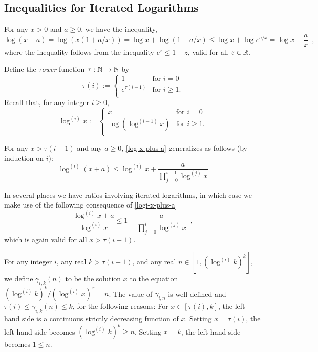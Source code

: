 \documentclass[kpfonts]{patmorin}
\theoremstyle{named}
\begin{document}
\subsection{Inequalities for Iterated Logarithms}

For any $x> 0$ and $a\ge 0$, we have the inequality,
\begin{equation}
    \log (x+a) = \log (x(1+a/x)) = \log x + \log(1+a/x) \le \log x + \log e^{a/x} = \log x + \frac{a}{x} \enspace , \label{log-x-plus-a}
\end{equation}
where the inequality follows from the inequality $e^z \le 1+z$, valid for all $z\in\mathbb{R}$.

Define the \emph{$\tau$ower} function $\tau:\mathbb{N}\to\mathbb{N}$ by
\[
  \tau(i) :=
    \begin{cases}
        1 & \text{for $i=0$} \\
        e^{\tau(i-1)} & \text{for $i\ge 1$.} \\
    \end{cases}
\]
Recall that, for any integer $i\ge 0$,
\[
    \log^{(i)} x :=
      \begin{cases}
          x & \text{for $i=0$} \\
          \log\left(\log^{(i-1)}x\right) & \text{for $i\ge 1$.} \\
      \end{cases}
\]

For any $x > \tau(i-1)$ and any $a\ge 0$, \cref{log-x-plus-a} generalizes as follows (by induction on $i$):
\begin{equation}
    \log^{(i)}(x+a) \le \log^{(i)} x + \frac{a}{\prod_{j=0}^{i-1}\log^{(j)} x} \label{logi-x-plus-a}
\end{equation}

In several places we have ratios involving iterated logarithms, in which case we make use of the following consequence of \cref{logi-x-plus-a}
\begin{equation}
    \frac{\log^{(i)} x+a}{\log^{(i)} x} \le 1 + \frac{a}{\prod_{j=0}^{i}\log^{(j)} x} \enspace, \label{logi-ratio}
\end{equation}
which is again valid for all $x> \tau(i-1)$.

For any integer $i$, any real $k>\tau(i-1)$, and any real $n\in[1,(\log^{(i)} k)^k]$, we define $\gamma_{i,k}(n)$ to be the solution $x$ to the equation $(\log^{(i)} k)^k/(\log^{(i)} x)^{x}=n$.  The value of $\gamma_{i,n}$ is well defined and $\tau(i)\le \gamma_{i,k}(n)\le k$, for the following reasons:  For $x\in[\tau(i),k]$, the left hand side is a continuous strictly decreasing function of $x$. Setting $x=\tau(i)$, the left hand side becomes $(\log^{(i)} k)^k \ge n$. Setting $x=k$, the left hand side becomes $1\le n$.
\end{document}
